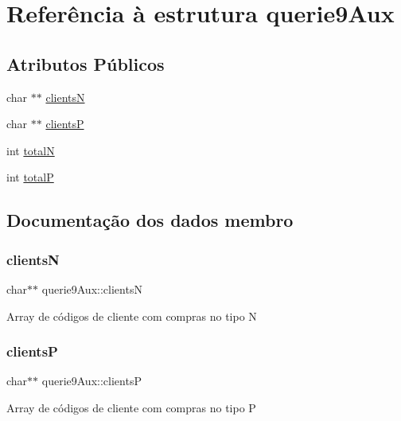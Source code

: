 \hypertarget{structquerie9Aux}{}\section{Referência à estrutura querie9\+Aux}
\label{structquerie9Aux}
\subsection*{Atributos Públicos}
\begin{DoxyCompactItemize}
\item 
char $\ast$$\ast$ \hyperlink{structquerie9Aux_a10e3ca058f8579d76b9fb4853a06ef97}{clientsN}
\item 
char $\ast$$\ast$ \hyperlink{structquerie9Aux_a6c7e6f98a40a70ee2fbb9e979aca4070}{clientsP}
\item 
int \hyperlink{structquerie9Aux_a6921e342c1d3f1f88959a5cf78e1d2ff}{totalN}
\item 
int \hyperlink{structquerie9Aux_a0fa6c4da6f8be963d045f313e2d7d2ef}{totalP}
\end{DoxyCompactItemize}


\subsection{Documentação dos dados membro}
\mbox{\label{structquerie9Aux_a10e3ca058f8579d76b9fb4853a06ef97}} 
\subsubsection{\texorpdfstring{clientsN}{clientsN}}
{\footnotesize\ttfamily char$\ast$$\ast$ querie9\+Aux\+::clientsN}

Array de códigos de cliente com compras no tipo N \mbox{\label{structquerie9Aux_a6c7e6f98a40a70ee2fbb9e979aca4070}} 
\subsubsection{\texorpdfstring{clientsP}{clientsP}}
{\footnotesize\ttfamily char$\ast$$\ast$ querie9\+Aux\+::clientsP}

Array de códigos de cliente com compras no tipo P \mbox{\label{structquerie9Aux_a6921e342c1d3f1f88959a5cf78e1d2ff}} 
